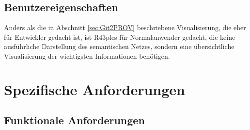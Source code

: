 \documentclass[nocolor]{tudbook}
\begin{document}
\subsection{Benutzereigenschaften}
Anders als die in Abschnitt \ref{sec:Git2PROV} beschriebene Visualisierung, die eher für Entwickler gedacht ist, ist R43ples für Normalanwender gedacht, die keine ausführliche Darstellung des semantischen Netzes, sondern eine übersichtliche Visualisierung der wichtigsten Informationen benötigen. 

\section{Spezifische Anforderungen}
\subsection{Funktionale Anforderungen}
\end{document}
